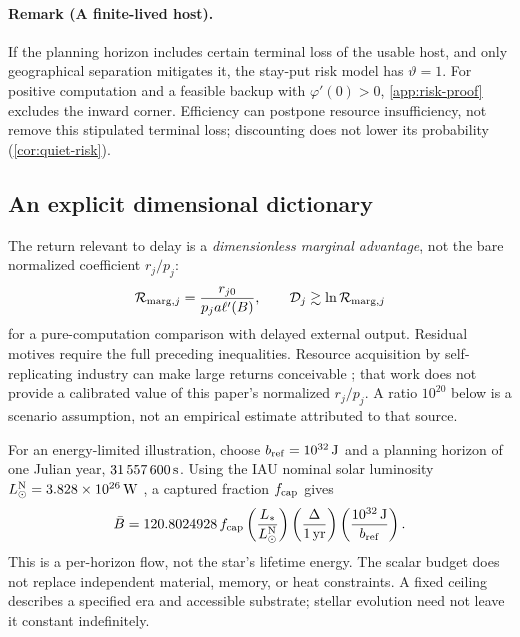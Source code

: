 \paragraph{Remark (A finite-lived host).}
If the planning horizon includes certain terminal loss of the usable host,
and only geographical separation mitigates it, the stay-put risk model has
$\vartheta=1$. For positive computation and a feasible backup with
$\varphi'(0)>0$, \cref{app:risk-proof} excludes the inward corner.
Efficiency can postpone resource insufficiency, not remove this stipulated
terminal loss; discounting does not lower its probability
(\cref{cor:quiet-risk}).

\subsection{An explicit dimensional dictionary}
The return relevant to delay is a \emph{dimensionless marginal advantage},
not the bare normalized coefficient $r_j/p_j$:
\begin{equation}
 \mathcal R_{{\rm marg},j}
   =\frac{r_{j0}}{p_j a\ell'(B)},\qquad
 \mathcal D_j\gtrsim\ln\mathcal R_{{\rm marg},j}
 \label{eq:physical-return-ratio}
\end{equation}
for a pure-computation comparison with delayed external output. Residual
motives require the full preceding inequalities. Resource acquisition by
self-replicating industry can make large returns conceivable
\citep{ArmstrongSandberg2013}; that work does not provide a calibrated
value of this paper's normalized $r_j/p_j$. A ratio $10^{20}$ below is a
scenario assumption, not an empirical estimate attributed to that source.

For an energy-limited illustration, choose $b_{\rm ref}=10^{32}\,{\rm J}$
and a planning horizon of one Julian year, $31\,557\,600\,{\rm s}$.
Using the IAU nominal solar luminosity
$L_\odot^{\rm N}=3.828\times10^{26}\,{\rm W}$ \citep{IAU2015}, a captured
fraction $f_{\rm cap}$ gives
\begin{equation}
 \bar B=120.8024928\,f_{\rm cap}
 \left(\frac{L_*}{L_\odot^{\rm N}}\right)
 \left(\frac{\Delta}{1\,{\rm yr}}\right)
 \left(\frac{10^{32}\,{\rm J}}{b_{\rm ref}}\right).
 \label{eq:stellar-budget}
\end{equation}
This is a per-horizon flow, not the star's lifetime energy. The scalar
budget does not replace independent material, memory, or heat constraints.
A fixed ceiling describes a specified era and accessible substrate;
stellar evolution need not leave it constant indefinitely.

